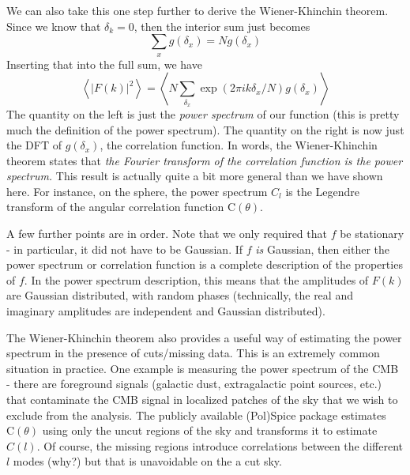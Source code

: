 \documentclass[letterpaper,11pt,preprint]{aastex}
\begin{document}
We can also take this one step further to derive the Wiener-Khinchin
theorem.  Since we know that $\delta_k=0$, then the interior sum just becomes
$$\sum_x g(\delta_x)=Ng(\delta_x)$$
Inserting that into the full sum, we have
$$\left <|F(k)|^2 \right > = \left <N \sum_{\delta_x} \exp(2\pi i
k\delta_x/N) g(\delta_x) \right > $$
The quantity on the left is just the {\textit{power spectrum}} of our
function (this is pretty much the definition of the power spectrum).
The quantity on the right is now just the DFT of $g(\delta_x)$, the
correlation function.  In words, the Wiener-Khinchin theorem states
that {\textit{the Fourier transform of the correlation function is the
    power spectrum.}}  This result is actually quite a bit more
general than we have shown here.  For instance, on the sphere, the
power spectrum $C_l$ is the Legendre transform of the angular
correlation function $\mathrm{C}(\theta)$.

A few further points are in order.  Note that we only required that
$f$ be stationary - in particular, it did not have to be Gaussian.  If
$f$ {\textit{is}} Gaussian, then either the power spectrum or
correlation function is a complete description of the properties of
$f$.  In the power spectrum description, this means that the
amplitudes of $F(k)$ are Gaussian distributed, with random phases
(technically, the real and imaginary amplitudes are independent and
Gaussian distributed).  

The Wiener-Khinchin theorem also provides a useful way of estimating
the power spectrum in the presence of cuts/missing data.  This is an
extremely common situation in practice.  One example is measuring the
power spectrum of the CMB - there are foreground signals (galactic
dust, extragalactic point sources, etc.) that contaminate the CMB
signal in localized patches of the sky that we wish to exclude from
the analysis.  The publicly available (Pol)Spice package estimates
$\mathrm{C}(\theta)$ using only the uncut regions of the sky and
transforms it to estimate $C(l)$.  Of course, the missing regions
introduce correlations between the different $l$ modes (why?) but that
is unavoidable on the a cut sky.
\end{document}
